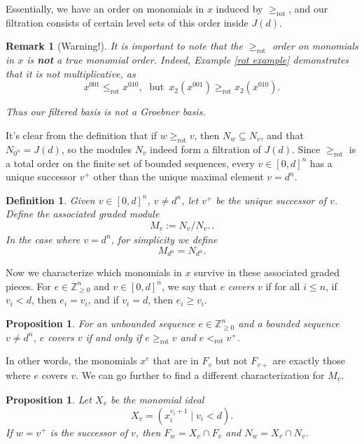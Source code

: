 \documentclass[submission]{FPSAC2027}
\newcommand{\Z}{\mathbb{Z}}
\newcommand{\rot}{\geq_{\mathrm{rot}}}
\newcommand{\rotleq}{\leq_{\mathrm{rot}}}
\newcommand{\uv}{\underline{v}}
\newtheorem{defn}[thm]{Definition}
\newtheorem{remark}[thm]{Remark}
\newtheorem{prop}[thm]{Proposition}
\begin{document}
 Essentially, we have an order on monomials in $x$ induced by $\rot$, and our filtration consists of certain level sets of this order inside $J(d)$.

\begin{remark}[Warning!]
It is important to note that the $\rot$ order on monomials in $x$ is \textbf{not} a true monomial order. Indeed, Example \ref{rot example} demonstrates that it is not multiplicative, as $$x^{001} \rotleq x^{010}, \; \textrm{ but } \, x_2 (x^{001}) \rot x_2 (x^{010}).$$

Thus our filtered basis is not a Groebner basis.
\end{remark}

It's clear from the definition that if $w \rot v$, then $N_w \subseteq N_v$, and that $N_{0^n} = J(d)$, so the modules $N_v$ indeed form a filtration of $J(d)$. Since $\rot$ is a total order on the finite set of bounded sequences, every $v \in [0,d]^n$ has a unique successor $v^+$ other than the unique maximal element $v = d^n$. 

\begin{defn}
    Given $v \in [0,d]^n$, $v\neq d^n$, let $v^+$ be the unique successor of $v$. Define the associated graded module
    $$M_{\uv} := N_v/N_{v^+}.$$
    In the case where $v = d^n$, for simplicity we define
    $$M_{d^n} = N_{d^n}.$$
\end{defn}

Now we characterize which monomials in $x$ survive in these associated graded pieces. For $e \in \Z_{\geq 0}^n$ and $v \in [0,d]^n$, we say that $e$ \textit{covers} $v$ if for all $i \leq n$, if $v_i<d$, then $e_i = v_i$, and if $v_i = d$, then $e_i \geq v_i$.

\begin{prop}
    \label{prop: e covers v}
    For an unbounded sequence $e \in \Z_{\geq 0}^n$ and a bounded sequence $v \neq d^n$, $e$ covers $v$ if and only if $e \rot v$ and $e <_{\mathrm{rot}} v^+$.
\end{prop}

In other words, the monomials $x^e$ that are in $F_v$ but not $F_{v+}$ are exactly those where $e$ covers $v$. We can go further to find a different characterization for $M_{\uv}$.

\begin{prop}
    \label{prop: Mw = Xv cap Mv}
    Let $X_v$ be the monomial ideal
    $$X_v = (x_i^{v_i+1} \mid v_i < d).$$
    If $w = v^+$ is the successor of $v$, then $F_w = X_v \cap F_v$ and $N_w = X_v \cap N_v$.
\end{prop}
\end{document}
